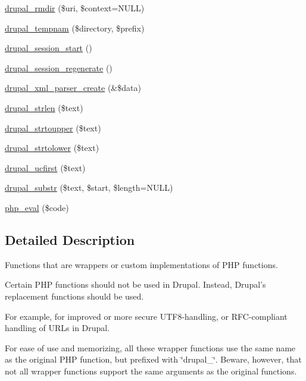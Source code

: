 \begin{DoxyCompactItemize}
\item 
\hyperlink{group__php__wrappers_ga394629431629976febfae765abd63e48}{drupal\_\-rmdir} (\$uri, \$context=NULL)
\item 
\hyperlink{group__php__wrappers_ga47b9f13fc4bed06501c52d1808de1661}{drupal\_\-tempnam} (\$directory, \$prefix)
\item 
\hyperlink{group__php__wrappers_gaef664546ab6308e639e0d6f6b363ae57}{drupal\_\-session\_\-start} ()
\item 
\hyperlink{group__php__wrappers_ga144f983d31722d56cef8cdf259d2f68f}{drupal\_\-session\_\-regenerate} ()
\item 
\hyperlink{group__php__wrappers_gab0e9cf694d0d48e586c117be348f1e24}{drupal\_\-xml\_\-parser\_\-create} (\&\$data)
\item 
\hyperlink{group__php__wrappers_gae8a4670a2f9b1c67d02259a49ee3ec7e}{drupal\_\-strlen} (\$text)
\item 
\hyperlink{group__php__wrappers_ga14c13d4684fa3dbed977bdcbf8f3a5d5}{drupal\_\-strtoupper} (\$text)
\item 
\hyperlink{group__php__wrappers_gad97b9d0b7d26db7c62671e9ddce98f8f}{drupal\_\-strtolower} (\$text)
\item 
\hyperlink{group__php__wrappers_ga15c15887a3e78bd69a50439373823517}{drupal\_\-ucfirst} (\$text)
\item 
\hyperlink{group__php__wrappers_gabe05f7e9107211f3ad82b564b1d7d598}{drupal\_\-substr} (\$text, \$start, \$length=NULL)
\item 
\hyperlink{group__php__wrappers_ga116b8b70b569d3b04f7e0717c8984ed6}{php\_\-eval} (\$code)
\end{DoxyCompactItemize}


\subsection{Detailed Description}
Functions that are wrappers or custom implementations of PHP functions.

Certain PHP functions should not be used in Drupal. Instead, Drupal's replacement functions should be used.

For example, for improved or more secure UTF8-\/handling, or RFC-\/compliant handling of URLs in Drupal.

For ease of use and memorizing, all these wrapper functions use the same name as the original PHP function, but prefixed with \char`\"{}drupal\_\-\char`\"{}. Beware, however, that not all wrapper functions support the same arguments as the original functions.

